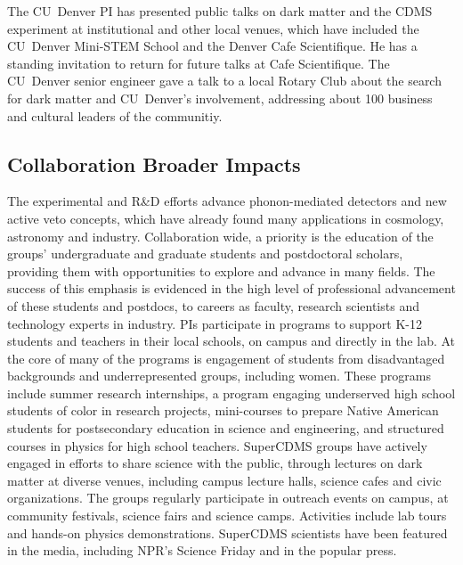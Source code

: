 The CU~Denver PI has presented public talks on dark matter and the CDMS experiment at institutional and other local venues, which have included the CU~Denver Mini-STEM School and the Denver Cafe Scientifique. He has a standing invitation to return for future talks at Cafe Scientifique. The CU~Denver senior engineer gave a talk to a local Rotary Club about the search for dark matter and CU~Denver's involvement, addressing about 100 business and cultural leaders of the communitiy.


\subsection{\SuperCDMS Collaboration Broader Impacts}
The \SuperCDMS experimental and R\&D efforts advance phonon-mediated detectors and new active veto concepts, which have already found many applications in cosmology, astronomy and industry. 
Collaboration wide, a priority is the education of the groups' undergraduate and graduate students and postdoctoral scholars, providing them with opportunities to explore and advance in many fields. The success of this emphasis is evidenced in the high level of professional advancement of these students and postdocs, to careers as faculty, research scientists and technology experts in industry. \SuperCDMS PIs participate in programs to support K-12 students and teachers in their local schools, on campus and directly in the lab. At the core of many of the programs is engagement of students from disadvantaged backgrounds and underrepresented groups, including women. These programs include summer research internships, a program engaging underserved high school students of color in research projects, mini-courses to prepare Native American students for postsecondary education in science and engineering, and structured courses in physics for high school teachers. SuperCDMS groups have actively engaged in efforts to share \SuperCDMS science with the public, through lectures on dark matter at diverse venues, including campus lecture halls, science cafes and civic organizations. The groups regularly participate in outreach events on campus, at community festivals, science fairs and science camps. Activities include lab tours and hands-on physics demonstrations. SuperCDMS scientists have been featured in the media, including NPR's Science Friday and in the popular press. 

